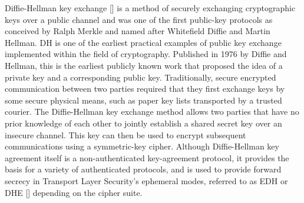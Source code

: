 Diffie-Hellman key exchange [\cite{li2010research}] is a method of securely exchanging cryptographic keys over a public channel
and was one of the first public-key protocols
as conceived by Ralph Merkle and named after Whitefield Diffie and Martin Hellman.
DH is one of the earliest practical examples of public key exchange implemented within the field of cryptography.
Published in 1976 by Diffie and Hellman, this is the earliest publicly known work that proposed the idea of a private
key and a corresponding public key.
Traditionally, secure encrypted communication between two parties required that they first exchange keys by some secure physical means,
such as paper key lists transported by a trusted courier.
The Diffie-Hellman key exchange method allows two parties that have no prior knowledge of
each other to jointly establish a shared secret key over an insecure channel.
This key can then be used to encrypt subsequent communications using a symmetric-key cipher.
Although Diffie-Hellman key agreement itself is a non-authenticated key-agreement protocol, it provides the basis for a
variety of authenticated protocols, and is used to provide forward secrecy in Transport Layer Security's ephemeral modes,
referred to as EDH or DHE [\cite{ahirwal2013elliptic}] depending on the cipher suite.

